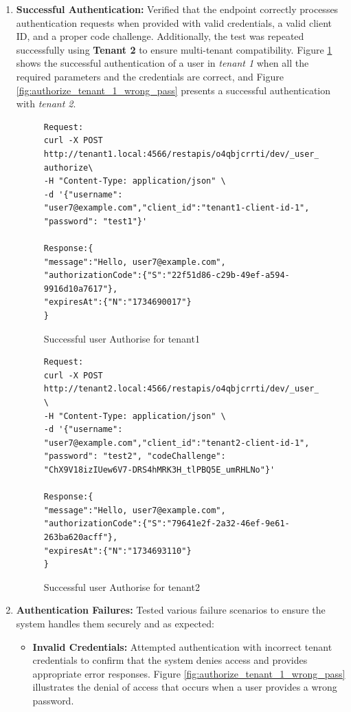 \begin{enumerate}
     \item \textbf{Successful Authentication:} Verified that the endpoint correctly processes authentication requests when provided with valid credentials, a valid client ID, and a proper code challenge. Additionally, the test was repeated successfully using \textbf{Tenant 2} to ensure multi-tenant compatibility. Figure \ref{fig:authorize_tenant_1_success} shows the successful authentication of a user in \textit{tenant 1} when all the required parameters and the credentials are correct, and Figure \ref{fig:authorize_tenant_1_wrong_pass} presents a successful authentication with \textit{tenant 2}.

\begin{figure}[!htbp]
    \centering
    \begin{lstlisting}[style=curlstyle]
Request:
curl -X POST http://tenant1.local:4566/restapis/o4qbjcrrti/dev/_user_request_/
authorize\
-H "Content-Type: application/json" \
-d '{"username": "user7@example.com","client_id":"tenant1-client-id-1", "password": "test1"}'

Response:{
"message":"Hello, user7@example.com",
"authorizationCode":{"S":"22f51d86-c29b-49ef-a594-9916d10a7617"},
"expiresAt":{"N":"1734690017"}
}
    \end{lstlisting}
    \caption{Successful user Authorise for tenant1}
    \label{fig:authorize_tenant_1_success}
\end{figure}


\begin{figure}[!htbp]
    \centering
    \begin{lstlisting}[style=curlstyle]
Request:
curl -X POST http://tenant2.local:4566/restapis/o4qbjcrrti/dev/_user_request_/authorize \                                  
-H "Content-Type: application/json" \
-d '{"username": "user7@example.com","client_id":"tenant2-client-id-1", "password": "test2", "codeChallenge": "ChX9V18izIUew6V7-DRS4hMRK3H_tlPBQ5E_umRHLNo"}'

Response:{
"message":"Hello, user7@example.com",
"authorizationCode":{"S":"79641e2f-2a32-46ef-9e61-263ba620acff"},
"expiresAt":{"N":"1734693110"}
}
    \end{lstlisting}
    \caption{Successful user Authorise for tenant2}
    \label{fig:authorize_tenant_2_success}
\end{figure}

\newpage
    \item \textbf{Authentication Failures:} Tested various failure scenarios to ensure the system handles them securely and as expected:
    \label{subsec:auth_failure_tests}
    \begin{itemize}
        \item \textbf{Invalid Credentials:} Attempted authentication with incorrect tenant credentials to confirm that the system denies access and provides appropriate error responses. Figure \ref{fig:authorize_tenant_1_wrong_pass} illustrates the denial of access that occurs when a user provides a wrong password.


\end{itemize}
\end{enumerate}
